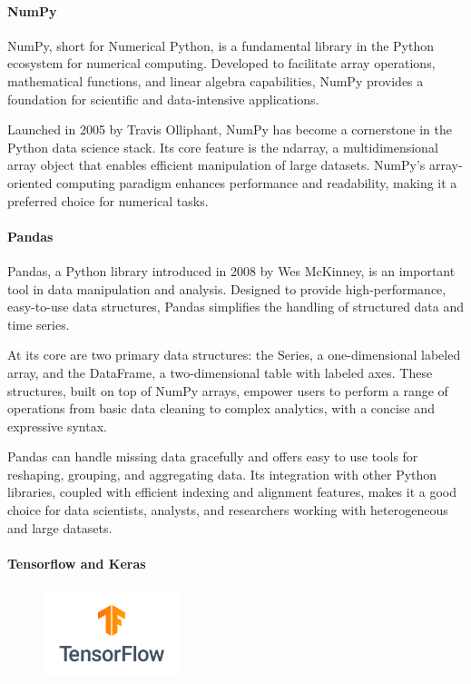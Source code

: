 \paragraph*{NumPy} NumPy, short for Numerical Python, is a fundamental library in the Python ecosystem for numerical computing. Developed to facilitate array operations, mathematical functions, and linear algebra capabilities, NumPy provides a foundation for scientific and data-intensive applications.

Launched in 2005 by Travis Olliphant, NumPy has become a cornerstone in the Python data science stack. Its core feature is the ndarray, a multidimensional array object that enables efficient manipulation of large datasets. NumPy's array-oriented computing paradigm enhances performance and readability, making it a preferred choice for numerical tasks.

\paragraph*{Pandas} Pandas, a Python library introduced in 2008 by Wes McKinney, is an important tool in data manipulation and analysis. Designed to provide high-performance, easy-to-use data structures, Pandas simplifies the handling of structured data and time series.

At its core are two primary data structures: the Series, a one-dimensional labeled array, and the DataFrame, a two-dimensional table with labeled axes. These structures, built on top of NumPy arrays, empower users to perform a range of operations from basic data cleaning to complex analytics, with a concise and expressive syntax.

Pandas can handle missing data gracefully and offers easy to use tools for reshaping, grouping, and aggregating data. Its integration with other Python libraries, coupled with efficient indexing and alignment features, makes it a good choice for data scientists, analysts, and researchers working with heterogeneous and large datasets.

\paragraph*{Tensorflow and Keras} 

\begin{figure}
\begin{center}
\includegraphics[height=1in]{Tensorflow_logo.png}
\end{center}
\end{figure}

